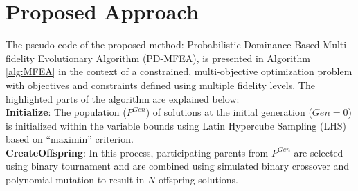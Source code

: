 \section{Proposed Approach}\label{sec:MFGA}

The pseudo-code of the proposed method: Probabilistic Dominance Based Multi-fidelity Evolutionary Algorithm (PD-MFEA), is presented in Algorithm \ref{alg:MFEA} in the context of a constrained, multi-objective optimization problem with objectives and constraints defined using multiple fidelity levels. The highlighted parts of the algorithm are explained below: \\

\noindent\textbf{Initialize}: The population ($P^{Gen}$) of solutions at the initial generation ($Gen=0$) is initialized within the variable bounds using Latin Hypercube Sampling (LHS) based on ``maximin'' criterion. \\

\noindent\textbf{CreateOffspring}: In this process, participating parents from $P^{Gen}$ are selected using binary tournament and are combined using simulated binary crossover and polynomial mutation to result in $N$ offspring solutions. \\ 

